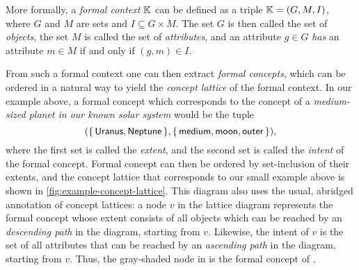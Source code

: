 More formally, a \emph{formal context} ${\mathbb{K}}$ can be defined as a triple ${\mathbb{K}} = (G,
M, I)$, where $G$ and $M$ are sets and $I \subseteq G \times M$.  The set $G$ is then
called the set of \emph{objects}, the set $M$ is called the set of \emph{attributes}, and
an attribute $g \in G$ \emph{has} an attribute $m \in M$ if and only if $(g, m) \in I$.

From such a formal context one can then extract \emph{formal concepts}, which can be
ordered in a natural way to yield the \emph{concept lattice} of the formal context.  In
our example above, a formal concept which corresponds to the concept of a
\emph{medium-sized planet in our known solar system} would be the tuple
\begin{equation}
  \label{eq:60}
  ( {\{\, \mathsf{Uranus}, \mathsf{Neptune} \,\}}, {\{\, \mathsf{medium}, \mathsf{moon},
    \mathsf{outer} \,\}} ),
\end{equation}
where the first set is called the \emph{extent}, and the second set is called the
\emph{intent} of the formal concept.  Formal concept can then be ordered by set-inclusion
of their extents, and the concept lattice that corresponds to our small example above is
shown in \ref{fig:example-concept-lattice}.  This diagram also uses the usual, abridged
annotation of concept lattices: a node $v$ in the lattice diagram represents the formal
concept whose extent consists of all objects which can be reached by an \emph{descending
  path} in the diagram, starting from $v$.  Likewise, the intent of $v$ is the set of all
attributes that can be reached by an \emph{ascending path} in the diagram, starting from
$v$.  Thus, the gray-shaded node in  is the formal
concept of .

